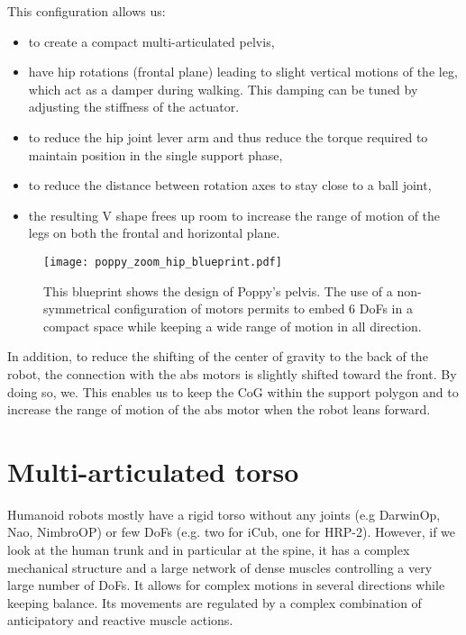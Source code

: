 This configuration allows us:

\begin{itemize}
    \item to create a compact multi-articulated pelvis,
    \item have hip rotations (frontal plane) leading to slight vertical motions of the leg, which act as a damper during walking. This damping can be tuned by adjusting the stiffness of the actuator.
    \item to reduce the hip joint lever arm and thus reduce the torque required to maintain position in the single support phase,
    \item to reduce the distance between rotation axes to stay close to a ball joint,
    \item the resulting V shape frees up room to increase the range of motion of the legs on both the frontal and horizontal plane.
\end{itemize}

\begin{figure}[p]
    \begin{center}
        \texttt{[image: poppy\_zoom\_hip\_blueprint.pdf]}
    \end{center}
    \caption{This blueprint shows the design of Poppy's pelvis. The use of a non-symmetrical configuration of motors permits to embed 6 DoFs in a compact space while keeping a wide range of motion in all direction.}
    \label{fig:poppy_zoom_hip_blueprint}
\end{figure}

In addition, to reduce the shifting of the center of gravity to the back of the robot, the connection with the abs motors is slightly shifted toward the front. By doing so, we.
This enables us to keep the CoG within the support polygon and to increase the range of motion of the abs motor when the robot leans forward.


\section{Multi-articulated torso} %

Humanoid robots mostly have a rigid torso without any joints (e.g DarwinOp, Nao, NimbroOP) or few DoFs (e.g. two for iCub, one for HRP-2). However, if we look at the human trunk and in particular at the spine, it has a complex mechanical structure and a large network of dense muscles controlling a very large number of DoFs. It allows for complex motions in several directions while keeping balance. Its movements are regulated by a complex combination of anticipatory and reactive muscle actions.

